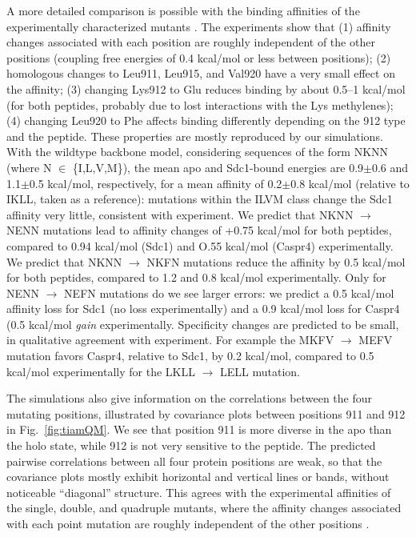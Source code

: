 \documentclass[12pt]{article}
\begin{document}
A more detailed comparison is possible with the binding affinities of the experimentally characterized mutants \cite{Sheperd11}.
The experiments show that (1) affinity changes associated with each position are roughly independent of the other positions (coupling
free energies of 0.4 kcal/mol or less between positions); (2) homologous changes to Leu911, Leu915, and Val920 have a very small
effect on the affinity; (3) changing Lys912 to Glu reduces binding by about 0.5--1 kcal/mol (for both peptides, probably due to lost
interactions with the Lys methylenes); (4) changing Leu920 to Phe affects binding differently depending on the 912 type and the peptide.
These properties are mostly reproduced by our simulations. With the wildtype backbone model, considering sequences of the form NKNN
(where N $\in$ \{I,L,V,M\}), the mean apo and Sdc1-bound energies are 0.9$\pm$0.6 and 1.1$\pm$0.5 kcal/mol, respectively, for a mean
affinity  of 0.2$\pm$0.8 kcal/mol (relative to IKLL, taken as a reference): mutations within the ILVM class change the Sdc1 affinity
very little, consistent with experiment. We predict that NKNN $\rightarrow$ NENN mutations lead to affinity changes of +0.75 kcal/mol
for both peptides, compared to 0.94 kcal/mol (Sdc1) and O.55 kcal/mol (Caspr4) experimentally. We predict that NKNN $\rightarrow$ NKFN
mutations reduce the affinity by 0.5 kcal/mol for both peptides, compared to 1.2 and 0.8 kcal/mol experimentally. Only for NENN
$\rightarrow$ NEFN mutations do we see larger errors: we predict a 0.5 kcal/mol affinity loss for Sdc1 (no loss experimentally)
and a 0.9 kcal/mol loss for Caspr4 (0.5 kcal/mol {\it gain} experimentally. Specificity changes are predicted to be small, in
qualitative agreement with experiment. For example the MKFV $\rightarrow$ MEFV mutation favors Caspr4, relative to Sdc1, by 0.2
kcal/mol, compared to 0.5 kcal/mol experimentally for the LKLL $\rightarrow$ LELL mutation.

The simulations also give information on the correlations between the four mutating positions, illustrated by covariance plots
between positions 911 and 912 in Fig.\ \ref{fig:tiamQM}. We see that position 911 is more diverse in the apo than the holo state,
while 912 is not very sensitive to the peptide. The predicted pairwise correlations between all four protein positions are weak,
so that the covariance plots mostly exhibit horizontal and vertical lines or bands, without noticeable ``diagonal'' structure.
This agrees with the experimental affinities of the single, double, and quadruple mutants, where the affinity changes associated
with each point mutation are roughly independent of the other positions \cite{Sheperd11}. 
\end{document}
